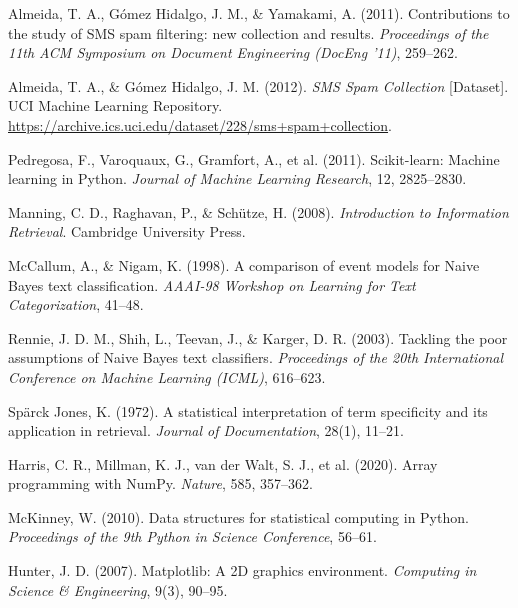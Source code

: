 \begin{enumerate}[resume*=refs, label={[\arabic*]}, leftmargin=1.27cm]
    \item\label{bib:almeida2011} Almeida, T. A., Gómez Hidalgo, J. M., \& Yamakami, A. (2011). Contributions to the study of SMS spam filtering: new collection and results. \textit{Proceedings of the 11th ACM Symposium on Document Engineering (DocEng '11)}, 259--262.
    \item\label{bib:uci_sms} Almeida, T. A., \& Gómez Hidalgo, J. M. (2012). \textit{SMS Spam Collection} [Dataset]. UCI Machine Learning Repository. \url{https://archive.ics.uci.edu/dataset/228/sms+spam+collection}.
    \item\label{bib:scikit-learn} Pedregosa, F., Varoquaux, G., Gramfort, A., et al. (2011). Scikit-learn: Machine learning in Python. \textit{Journal of Machine Learning Research}, 12, 2825--2830.
    \item\label{bib:manning2008} Manning, C. D., Raghavan, P., \& Schütze, H. (2008). \textit{Introduction to Information Retrieval}. Cambridge University Press.
    \item\label{bib:mccallum1998} McCallum, A., \& Nigam, K. (1998). A comparison of event models for Naive Bayes text classification. \textit{AAAI-98 Workshop on Learning for Text Categorization}, 41--48.
    \item\label{bib:rennie2003} Rennie, J. D. M., Shih, L., Teevan, J., \& Karger, D. R. (2003). Tackling the poor assumptions of Naive Bayes text classifiers. \textit{Proceedings of the 20th International Conference on Machine Learning (ICML)}, 616--623.
    \item\label{bib:sparckjones1972} Spärck Jones, K. (1972). A statistical interpretation of term specificity and its application in retrieval. \textit{Journal of Documentation}, 28(1), 11--21.
    \item\label{bib:numpy2020} Harris, C. R., Millman, K. J., van der Walt, S. J., et al. (2020). Array programming with NumPy. \textit{Nature}, 585, 357--362.
    \item\label{bib:pandas2010} McKinney, W. (2010). Data structures for statistical computing in Python. \textit{Proceedings of the 9th Python in Science Conference}, 56--61.
    \item\label{bib:matplotlib2007} Hunter, J. D. (2007). Matplotlib: A 2D graphics environment. \textit{Computing in Science \& Engineering}, 9(3), 90--95.
\end{enumerate}
